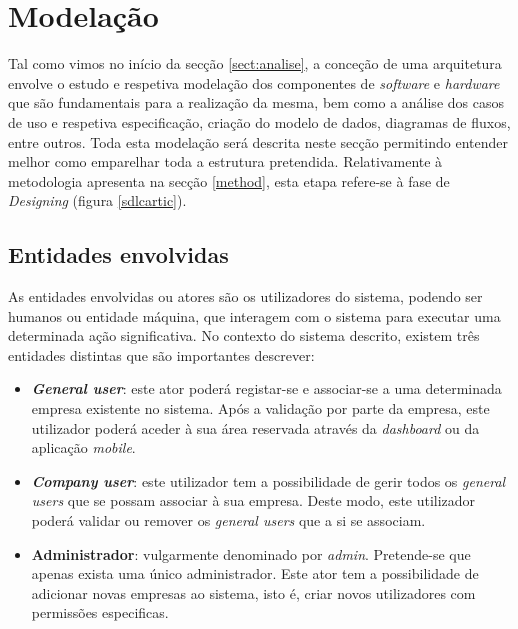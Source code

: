 






\section{Modelação}

Tal como vimos no início da secção \ref{sect:analise}, a conceção de uma arquitetura envolve o estudo e respetiva modelação dos componentes de \textit{software} e \textit{hardware} que são fundamentais para a realização da mesma, bem como a análise dos casos de uso e respetiva especificação, criação do modelo de dados, diagramas de fluxos, entre outros. Toda esta modelação será descrita neste secção permitindo entender melhor como emparelhar toda a estrutura pretendida. Relativamente à metodologia apresenta na secção \ref{method}, esta etapa refere-se à fase de \textit{Designing} (figura \ref{sdlcartic}). 






\subsection{Entidades envolvidas}

As entidades envolvidas ou atores são os utilizadores do sistema, podendo ser humanos ou entidade máquina, que interagem com o sistema para executar uma determinada ação significativa. No contexto do sistema descrito, existem três entidades distintas que são importantes descrever: 

\begin{itemize}
	
	\item \textbf{\textit{General user}}: este ator poderá registar-se e associar-se a uma determinada empresa existente no sistema. Após a validação por parte da empresa, este utilizador poderá aceder à sua área reservada através da \textit{dashboard} ou da aplicação \textit{mobile}. 
	
	\item \textbf{\textit{Company user}}: este utilizador tem a possibilidade de gerir todos os \textit{general users} que se possam associar à sua empresa. Deste modo, este utilizador poderá validar ou remover os \textit{general users} que a si se associam. 
	
	\item \textbf{Administrador}: vulgarmente denominado por \textit{admin}. Pretende-se que apenas exista uma único administrador. Este ator tem a possibilidade de adicionar novas empresas ao sistema, isto é, criar novos utilizadores com permissões especificas. 
	
\end{itemize}




